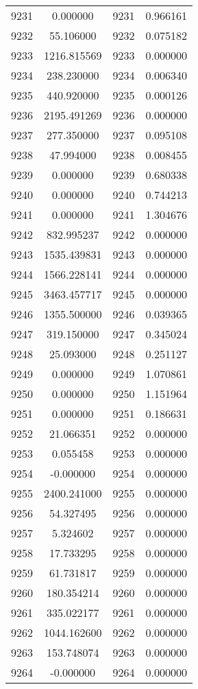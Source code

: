 \documentclass[12pt]{article}
\begin{document}
\begin{longtable}{@{}cccc@{}}
9231 & 0.000000 & 9231 & 0.966161 \\
9232 & 55.106000 & 9232 & 0.075182 \\
9233 & 1216.815569 & 9233 & 0.000000 \\
9234 & 238.230000 & 9234 & 0.006340 \\
9235 & 440.920000 & 9235 & 0.000126 \\
9236 & 2195.491269 & 9236 & 0.000000 \\
9237 & 277.350000 & 9237 & 0.095108 \\
9238 & 47.994000 & 9238 & 0.008455 \\
9239 & 0.000000 & 9239 & 0.680338 \\
9240 & 0.000000 & 9240 & 0.744213 \\
9241 & 0.000000 & 9241 & 1.304676 \\
9242 & 832.995237 & 9242 & 0.000000 \\
9243 & 1535.439831 & 9243 & 0.000000 \\
9244 & 1566.228141 & 9244 & 0.000000 \\
9245 & 3463.457717 & 9245 & 0.000000 \\
9246 & 1355.500000 & 9246 & 0.039365 \\
9247 & 319.150000 & 9247 & 0.345024 \\
9248 & 25.093000 & 9248 & 0.251127 \\
9249 & 0.000000 & 9249 & 1.070861 \\
9250 & 0.000000 & 9250 & 1.151964 \\
9251 & 0.000000 & 9251 & 0.186631 \\
9252 & 21.066351 & 9252 & 0.000000 \\
9253 & 0.055458 & 9253 & 0.000000 \\
9254 & -0.000000 & 9254 & 0.000000 \\
9255 & 2400.241000 & 9255 & 0.000000 \\
9256 & 54.327495 & 9256 & 0.000000 \\
9257 & 5.324602 & 9257 & 0.000000 \\
9258 & 17.733295 & 9258 & 0.000000 \\
9259 & 61.731817 & 9259 & 0.000000 \\
9260 & 180.354214 & 9260 & 0.000000 \\
9261 & 335.022177 & 9261 & 0.000000 \\
9262 & 1044.162600 & 9262 & 0.000000 \\
9263 & 153.748074 & 9263 & 0.000000 \\
9264 & -0.000000 & 9264 & 0.000000 \\

\end{longtable}
\end{document}
